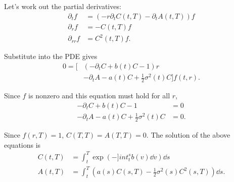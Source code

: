 \documentclass[square]{article} %
\theoremstyle{plain}
\theoremstyle{definition} %
\begin{document}
Let's work out the partial derivatives:
\begin{align*}
  \partial_t f &= \left(-r \partial_t C(t,T) - \partial_t A(t,T)\right) f\\
  \partial_r f &= -C(t,T)f\\
  \partial_{rr} f &= C^2(t,T)f.
\end{align*}

Substitute into the PDE gives
\begin{align*}
0=\Big[
&\left(
-\partial_t C+ b(t)C-1
\right)r\\
&-\partial_t A - a(t)C+\frac{1}{2}\sigma^2(t)C
\Big]f(t,r).
\end{align*}
 
Since $f$ is nonzero and this equation must hold for all $r$, 
\begin{align*}
  -\partial_t C+ b(t)C-1 &=0\\
  -\partial_t A - a(t)C+\frac{1}{2}\sigma^2(t)C &=0.
\end{align*}

Since $f(r,T)=1$, $C(T,T)=A(T,T)=0$. The solution of the above equations is 
\begin{align*}
  C(t,T) &= \int_t^T \exp\left(-]int_t^s b(v)\dd v\right)\dd s\\
  A(t,T) &= \int_t^T \left(a(s) C(s,T)-\frac{1}{2}\sigma^2(s)C^2(s,T)\right)\dd s.
\end{align*}


\end{document}
